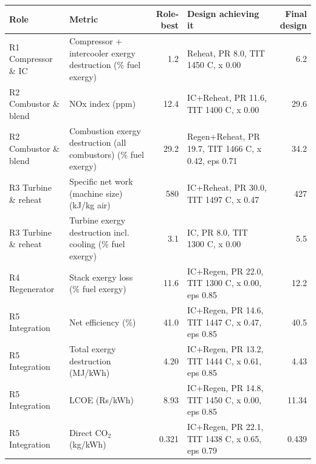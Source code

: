 \begin{tabular}{p{2.6cm}p{3.6cm}rp{5.2cm}r}\toprule Role & Metric & Role-best & Design achieving it & Final design\\\midrule
R1 Compressor \& IC & Compressor + intercooler exergy destruction (\% fuel exergy) & 1.2 & Reheat, PR 8.0, TIT 1450 C, x 0.00 & 6.2\\
R2 Combustor \& blend & NOx index (ppm) & 12.4 & IC+Reheat, PR 11.6, TIT 1400 C, x 0.00 & 29.6\\
R2 Combustor \& blend & Combustion exergy destruction (all combustors) (\% fuel exergy) & 29.2 & Regen+Reheat, PR 19.7, TIT 1466 C, x 0.42, eps 0.71 & 34.2\\
R3 Turbine \& reheat & Specific net work (machine size) (kJ/kg air) & 580 & IC+Reheat, PR 30.0, TIT 1497 C, x 0.47 & 427\\
R3 Turbine \& reheat & Turbine exergy destruction incl. cooling (\% fuel exergy) & 3.1 & IC, PR 8.0, TIT 1300 C, x 0.00 & 5.5\\
R4 Regenerator & Stack exergy loss (\% fuel exergy) & 11.6 & IC+Regen, PR 22.0, TIT 1300 C, x 0.00, eps 0.85 & 12.2\\
R5 Integration & Net efficiency (\%) & 41.0 & IC+Regen, PR 14.6, TIT 1447 C, x 0.47, eps 0.85 & 40.5\\
R5 Integration & Total exergy destruction (MJ/kWh) & 4.20 & IC+Regen, PR 13.2, TIT 1444 C, x 0.61, eps 0.85 & 4.43\\
R5 Integration & LCOE (Rs/kWh) & 8.93 & IC+Regen, PR 14.8, TIT 1450 C, x 0.00, eps 0.85 & 11.34\\
R5 Integration & Direct CO$_2$ (kg/kWh) & 0.321 & IC+Regen, PR 22.1, TIT 1438 C, x 0.65, eps 0.79 & 0.439\\
\bottomrule\end{tabular}